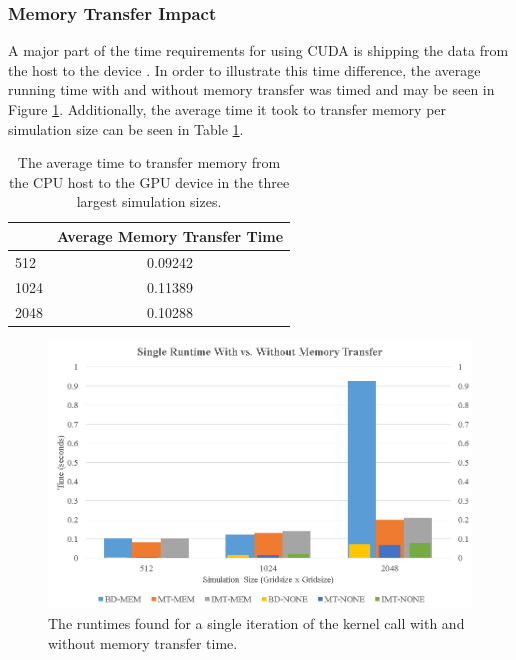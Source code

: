 \subsubsection{Memory Transfer Impact}
A major part of the time requirements for using CUDA is shipping the data from the host to the device \cite{cudabyexample}. In order to illustrate this time difference, the average running time with and without memory transfer was timed and may be seen in Figure \ref{fig:mem_comp}. Additionally, the average time it took to transfer memory per simulation size can be seen in Table \ref{table:mem_time}.
\begin{table}[H]
\centering
\caption{The average time to transfer memory from the CPU host to the GPU device in the three largest simulation sizes.}
\label{table:mem_time}
\begin{tabular}{l|c|}
\cline{2-2}
                           & \multicolumn{1}{l|}{Average Memory Transfer Time} \\ \hline
\multicolumn{1}{|l|}{512}  & 0.09242                                           \\ \hline
\multicolumn{1}{|l|}{1024} & 0.11389                                           \\ \hline
\multicolumn{1}{|l|}{2048} & 0.10288                                           \\ \hline
\end{tabular}
\end{table} 
\begin{figure}[H]
\centering
  \includegraphics[height=.4\textheight]{figures/results/mem_compare.png}
  \caption{The runtimes found for a single iteration of the kernel call with and without memory transfer time.}
  \label{fig:mem_comp}
\end{figure} 

